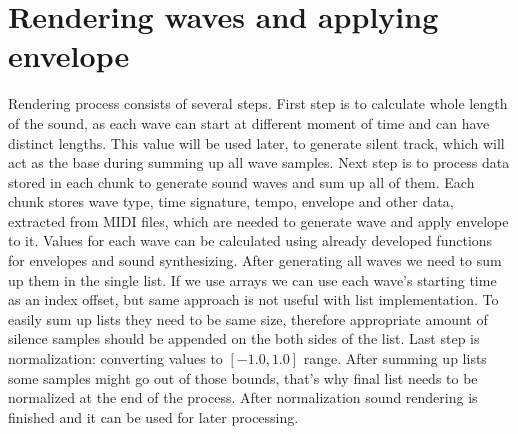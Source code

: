 \documentclass[12pt, a4paper]{article}
\begin{document}
\section{Rendering waves and applying envelope}

Rendering process consists of several steps. First step is to calculate whole length of the sound, as each wave can start at different moment of time and can have distinct lengths. This value will be used later, to generate silent track, which will act as the base during summing up all wave samples.  Next step is to process data stored in each chunk to generate sound waves and sum up all of them. Each chunk stores wave type, time signature, tempo, envelope and other data, extracted from MIDI files, which are needed to generate wave and apply envelope to it. Values for each wave can be calculated using already developed functions for envelopes and sound synthesizing. After generating all waves we need to sum up them in the single list. If we use arrays we can use each wave’s starting time as an index offset, but same approach is not useful with list implementation. To easily sum up lists they need to be same size, therefore appropriate amount of silence samples should be appended on the both sides of the list. Last step is normalization: converting values to \([-1.0, 1.0]\) range. After summing up lists some samples might go out of those bounds, that’s why final list needs to be normalized at the end of the process. After normalization sound rendering is finished and it can be used for later processing.
\end{document}
